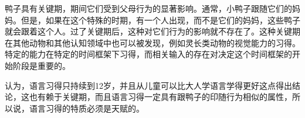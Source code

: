 鸭子具有关键期，期间它们受到父母行为的显著影响。通常，小鸭子跟随它们的妈妈。但是，如果在这个特殊的时期，有一个人出现，而不是它们的妈妈，这些鸭子就会跟着这个人。过了关键期后，这种对它们行为的影响就不存在了\citep{Lorenz70a-u}。这种关键期在其他动物和其他认知领域中也可以被发现，例如灵长类动物的视觉能力的习得。特定的能力在特定的时间框架下习得，而相关输入的存在对决定这个时间框架的开始阶段是重要的。

 \citet{Lenneberg64a}认为，语言习得只持续到12岁，并且从儿童可以比大人学语言学得更好这点得出结论，这也有赖于关键期，而且语言习得一定具有跟鸭子的印随行为相似的属性，所以说，语言习得的特质必须是天赋的\citep[\S~4]{Lenneberg67a-u}。

